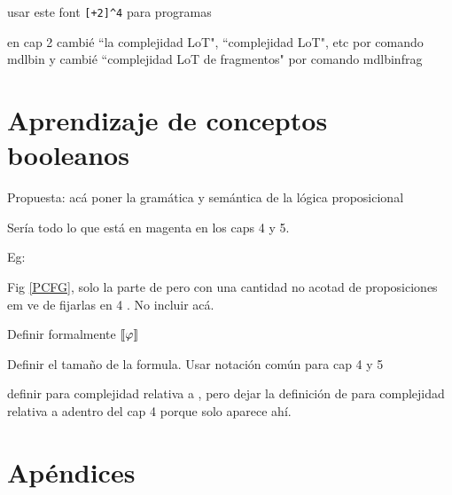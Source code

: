 \documentclass[a4paper,12pt,oneside]{book}
\begin{document}
    usar este font \verb#[+2]^4# para programas

    en cap 2 cambié ``la complejidad LoT", ``complejidad LoT", etc por comando mdlbin y cambié  ``complejidad LoT de fragmentos" por comando mdlbinfrag




    \color{black}


    
    

    \part{Aprendizaje de conceptos booleanos}
    \color{magenta}
    Propuesta: acá poner la gramática y semántica de la lógica proposicional

    Sería todo lo que está en magenta en los caps 4 y 5.

    Eg:
    
    Fig \ref{PCFG}, solo la parte de \grambool pero con una cantidad no acotad de proposiciones em ve de fijarlas en 4 . No incluir \gramboolxor acá.

    Definir formalmente $\llbracket \varphi\rrbracket$

    Definir el tamaño de la formula. Usar notación común para cap 4 y 5

    definir  \mdl{\grambool} para complejidad relativa a \grambool, pero dejar la definición de
      \mdl{\gramboolxor} para complejidad relativa a \gramboolxor adentro del cap 4 porque solo aparece ahí. 





    \color{black}

    
    
    
    
    \part{Apéndices}
    \appendix
    
    
    
    
    
    
\end{document}
